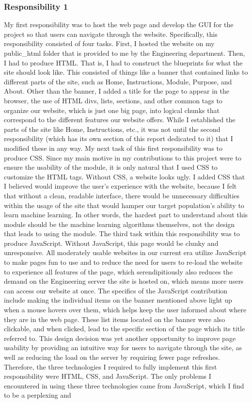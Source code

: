 \documentclass[letterpaper, 10pt,titlepage]{article}
\begin{document}
\subsubsection{Responsibility 1}
\par My first responsibility was to host the web page and develop the GUI for the project so that users can navigate through the website. Specifically, this responsibility consisted of four tasks. First, I hosted the website on my public_html folder that is provided to me by the Engineering department. Then, I had to produce HTML. That is, I had to construct the blueprints for what the site should look like. This consisted of things like a banner that contained links to different parts of the site, such as Home, Instructions, Module, Purpose, and About. Other than the banner, I added a title for the page to appear in the browser, the use of HTML divs, lists, sections, and other common tags to organize our website, which is just one big page, into logical chunks that correspond to the different features our website offers. While I established the parts of the site like Home, Instructions, etc., it was not until the second responsibility (which has its own section of this report dedicated to it) that I modified these in any way. My next task of this first responsibility was to produce CSS. Since my main motive in my contributions to this project were to ensure the usability of the module, it is only natural that I used CSS to customize the HTML tags. Without CSS, a website looks ugly. I added CSS that I believed would improve the user's experience with the website, because I felt that without a clean, readable interface, there would be unnecessary difficulties within the usage of the site that would hamper our target population's ability to learn machine learning. In other words, the hardest part to understand about this module should be the machine learning algorithms themselves, not the design that leads to using the module. The third task within this responsibility was to produce JavaScript. Without JavaScript, this page would be clunky and unresponsive. All moderately usable websites in our current era utilize JavaScript to make pages fun to use and to reduce the need for users to re-load the website to experience all features of the page, which serendipitiously also reduces the demand on the Engineering server the site is hosted on, which means more users can access our website at once. The specifics of the JavaScript contribution include making the individual items on the banner mentioned above light up when a mouse hovers over them, which helps keep the user informed about where they are in the web page. These list items located on the banner were also clickable, and when clicked, lead to the specific section of the page which its title referred to. This design decision was yet another opportunity to improve page usability by providing an intuitive way for users to navigate through the site, as well as reducing the load on the server by requiring fewer page refreshes. Therefore, the three technologies I required to fully implement this first responsibility were HTML, CSS, and JavaScript. The only problems I encountered in using these three technologies came from JavaScript, which I find to be a perplexing and 
\end{document}
